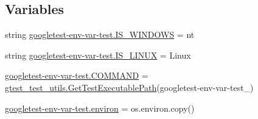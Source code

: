 \subsection*{Variables}
\begin{DoxyCompactItemize}
\item 
string \mbox{\hyperlink{namespacegoogletest-env-var-test_ae045d8de4820c83223f27ff1c2699fc7}{googletest-\/env-\/var-\/test.\+I\+S\+\_\+\+W\+I\+N\+D\+O\+WS}} = \textquotesingle{}nt\textquotesingle{}
\item 
string \mbox{\hyperlink{namespacegoogletest-env-var-test_a55c1ed746133ca7a86a9d5c19e6cc05c}{googletest-\/env-\/var-\/test.\+I\+S\+\_\+\+L\+I\+N\+UX}} = \textquotesingle{}Linux\textquotesingle{}
\item 
\mbox{\hyperlink{namespacegoogletest-env-var-test_a1973327f302e133104ae3ad3eecf17f3}{googletest-\/env-\/var-\/test.\+C\+O\+M\+M\+A\+ND}} = \mbox{\hyperlink{namespacegtest__test__utils_a89ed3717984a80ffbb7a9c92f71b86a2}{gtest\+\_\+test\+\_\+utils.\+Get\+Test\+Executable\+Path}}(\textquotesingle{}googletest-\/env-\/var-\/test\+\_\+\textquotesingle{})
\item 
\mbox{\hyperlink{namespacegoogletest-env-var-test_ade23d144de09227d3ee09500bddcffd2}{googletest-\/env-\/var-\/test.\+environ}} = os.\+environ.\+copy()
\end{DoxyCompactItemize}
